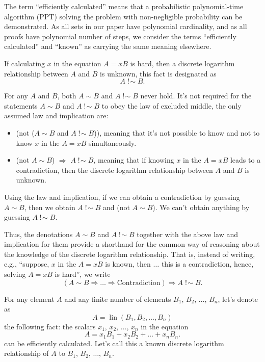\documentclass{mathcryptology} %
\DeclareMathOperator{\notsim}{!\!\sim}
\DeclareMathOperator{\lin}{lin}
\theoremstyle{title}
\theoremstyle{titleof}
\begin{document}
    The term ``efficiently calculated'' means that a probabilistic polynomial-time algorithm (PPT) solving the problem with non-negligible probability can be demonstrated. As all sets in our paper have polynomial cardinality, and as all proofs have polynomial number of steps, we consider the terms ``efficiently calculated'' and ``known'' as carrying the same meaning elsewhere.

    If calculating $x$ in the equation $A=xB$ is hard, then a discrete logarithm relationship between $A$ and $B$ is unknown, this fact is designated as
    \begin{equation*}
        A\notsim B.
    \end{equation*}

    For any $A$ and $B$, both $A\sim B$ and $A\notsim B$ never hold. It's not required for the statements $A\sim B$ and $A\notsim B$ to obey the law of excluded middle, the only assumed law and implication are:
    \begin{itemize}
        \item (not ($A\sim B$ and $A\notsim B$)), meaning that it's not possible to know and not to know $x$ in the $A=xB$ simultaneously.
        \item (not $A\sim B$) $\Rightarrow$ $A\notsim B$, meaning that if knowing $x$ in the $A=xB$ leads to a contradiction, then the discrete logarithm relationship between $A$ and $B$ is unknown.
    \end{itemize}

    Using the law and implication, if we can obtain a contradiction by guessing $A\sim B$, then we obtain $A\notsim B$ and (not $A\sim B$). We can't obtain anything by guessing $A\notsim B$.

    Thus, the denotations $A\sim B$ and $A\notsim B$ together with the above law and implication for them provide a shorthand for the common way of reasoning about the knowledge of the discrete logarithm relationship. That is, instead of writing, e.g., ``suppose, $x$ in the $A=xB$ is known, then ${\dots}$ this is a contradiction, hence, solving $A=xB$ is hard'', we write
    \begin{equation*}
        \left(A\sim B \Rightarrow {\dots} \Rightarrow \text{Contradiction}\right) \Rightarrow A\notsim B.
    \end{equation*}
    
    For any element $A$ and any finite number of elements $B_{1}$, $B_{2}$, ${\dots}$, $B_{n}$, let's denote as
    \begin{equation*}
        A = \lin\left(B_{1}, B_{2}, {\dots}, B_{n}\right)
    \end{equation*}
    the following fact: the scalars $x_{1}$, $x_{2}$, ${\dots}$, $x_{n}$ in the equation
    \begin{equation*}
        A = x_{1} B_{1} + x_{2} B_{2} + {\dots} +x_{n}B_{n}.
    \end{equation*}
    can be efficiently calculated. Let's call this a known discrete logarithm relationship of $A$ to $B_{1}$, $B_{2}$, ${\dots}$, $B_{n}$.
\end{document}

